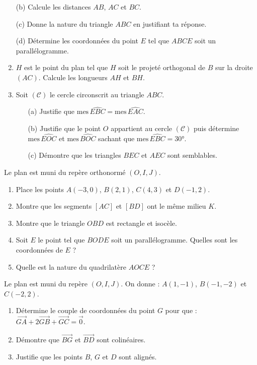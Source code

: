 \begin{multicols*}{2}
\begin{enumerate}
  		(b) Calcule les distances $AB$, $AC$ et $BC$.
  		
  		(c) Donne la nature du triangle $ABC$ en justifiant ta réponse.
  		
  		(d) Détermine les coordonnées du point $E$ tel que $ABCE$ soit un parallélogramme.
  		\item $H$ est le point du plan tel que $H$ soit le projeté orthogonal de $B$ sur la droite $(AC)$.
  		Calcule les longueurs $AH$ et $BH$.
  		\item Soit $(\mathscr{C})$ le cercle circonscrit au triangle $ABC$.
  		\begin{enumerate}
  			\item[(a)] Justifie que $\text{mes}\,\widehat{EBC} = \text{mes}\,\widehat{EAC}$.
  			\item[(b)] Justifie que le point $O$ appartient au cercle $(\mathscr{C})$ puis détermine $\text{mes}\,\widehat{EOC}$ et $\text{mes}\,\widehat{BOC}$ sachant que $\text{mes}\,\widehat{EBC} = 30°$.
  			\item[(c)] Démontre que les triangles $BEC$ et $AEC$ sont semblables.
  		\end{enumerate}
  	\end{enumerate}
  	
  	Le plan est muni du repère orthonormé $(O,I,J)$.
  	\begin{enumerate}
  		\item Place les points $A(-3,0)$, $B(2,1)$, $C(4,3)$ et $D(-1,2)$.
  		\item Montre que les segments $[AC]$ et $[BD]$ ont le même milieu $K$.
  		\item Montre que le triangle $OBD$ est rectangle et isocèle.
  		\item Soit $E$ le point tel que $BODE$ soit un parallélogramme.
  		Quelles sont les coordonnées de $E$ ?
  		\item Quelle est la nature du quadrilatère $AOCE$ ?
  	\end{enumerate}
  	
  	Le plan est muni du repère $(O,I,J)$. On donne : $A(1,-1)$, $B(-1,-2)$ et $C(-2,2)$.
  	\begin{enumerate}
  		\item Détermine le couple de coordonnées du point $G$ pour que : $\overrightarrow{GA}+2\overrightarrow{GB}+\overrightarrow{GC} = \vec{0}$.
  		\item Démontre que $\overrightarrow{BG}$ et $\overrightarrow{BD}$ sont colinéaires.
  		\item Justifie que les points $B$, $G$ et $D$ sont alignés.
  	\end{enumerate}
  	

\end{multicols*}
